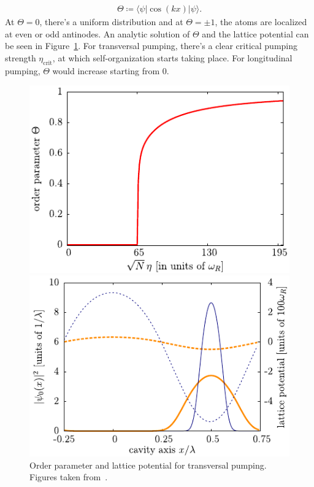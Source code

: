 \begin{align}
\Theta \coloneqq \langle \psi | \cos(kx) | \psi \rangle.
\end{align}At $\Theta = 0$, there's a uniform distribution and at $\Theta = \pm 1$, the atoms are localized at even or odd antinodes. An analytic solution of $\Theta$ and the lattice potential can be seen in Figure~\ref{fig:self-organization}. For transversal pumping, there's a clear critical pumping strength $\eta_\text{crit}$, at which self-organization starts taking place. For longitudinal pumping, $\Theta$ would increase starting from 0.

\begin{figure}[!htb]
	\begin{minipage}[b]{.5\linewidth}
	\centering
	\includegraphics[width=1\linewidth]{images/order-parameter.pdf}
	\end{minipage}
%
	\begin{minipage}[b]{.5\linewidth}
	\centering
	\includegraphics[width=1\linewidth]{images/lattice-potential.pdf}
	\end{minipage}
\caption{Order parameter and lattice potential for transversal pumping. Figures taken from~\cite{Nagy2008}.}
\label{fig:self-organization}
\end{figure}
\FloatBarrier